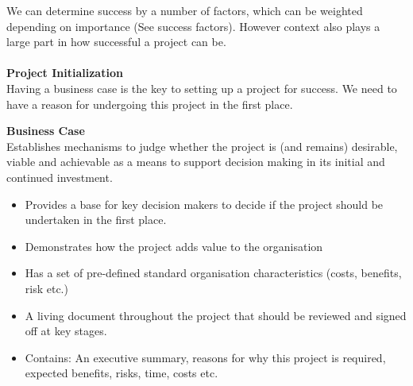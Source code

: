 \documentclass[a4paper,10pt]{article}
\begin{document}
\noindent We can determine success by a number of factors, which can be weighted depending on importance (See success factors). However context also plays a large part in how successful a project can be. \\\\
\textcolor{BlueGreen}{\textbf{Project Initialization}}\\
Having a business case is the key to setting up a project for success. We need to have a reason for undergoing this project in the first place.
\begin{shaded}
\noindent \textcolor{Emerald}{\textbf{Business Case}} \\
Establishes mechanisms to judge whether the project is (and remains) desirable, viable and achievable as a means to support decision making in its initial and continued investment. 
\end{shaded}
\begin{itemize}
	\item Provides a base for key decision makers to decide if the project should be undertaken in the first place. 
	\item Demonstrates how the project adds value to the organisation 
	\item Has a set of pre-defined standard organisation characteristics (costs, benefits, risk etc.)
	\item A living document throughout the project that should be reviewed and signed off at key stages. 
	\item Contains: An executive summary, reasons for why this project is required, expected benefits, risks, time, costs etc. 
\end{itemize}
\end{document}
